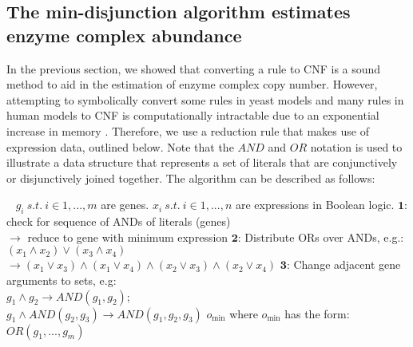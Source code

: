 \subsection{The min-disjunction algorithm estimates \\enzyme complex abundance}

In the previous section, we showed that converting a rule to CNF is a
sound method to aid in the estimation of enzyme complex copy number.
However, attempting to symbolically convert some rules in yeast models and
many rules in human models to CNF is computationally intractable due
to an exponential increase in memory \citep{Russell2009}. Therefore,
we use a reduction rule that makes use of expression data, outlined
below.  Note that the $AND$ and $OR$ notation is used to illustrate a
data structure that represents a set of literals that are
conjunctively or disjunctively joined together. The algorithm can be
described as follows:

\begin{AlgFloat}[H]
\begin{Algorithm}
\label{alg:ReductionToCNF}
\begin{algorithmic}
~
\REQUIRE $g_i~s.t.~i \in{1, ..., m}$ are genes. 
\REQUIRE $x_i~s.t.~i \in{1, ..., n}$ are expressions in Boolean logic.
  \STATE $\mathbf{1}$: check for sequence of ANDs of literals (genes)\\ 
    \hspace{4.8 mm} $\rightarrow$ reduce to gene with minimum expression 
  \STATE $\mathbf{2}$: Distribute ORs over ANDs, e.g.: $(x_1 \land x_2) \lor (x_3 \land x_4)$ \\ 
    \hspace{4.8 mm} $\rightarrow (x_1 \lor x_3) \land (x_1 \lor x_4) \land (x_2 \lor x_3) \land (x_2 \lor x_4)$
  \STATE $\mathbf{3}$: Change adjacent gene arguments to sets, e.g: \\
    \hspace{4.8 mm} $g_1 \land g_2 \rightarrow AND(g_1,g_2)$;  \\
    \hspace{4.8 mm} $g_1 \land AND(g_2,g_3) \rightarrow AND(g_1,g_2,g_3)$ 
\ENDWHILE
\ENSURE $o_{\min}$ where $o_{\min}$ has the form: $OR(g_1,...,g_m)$
\end{algorithmic} 
\end{Algorithm}
\end{AlgFloat}

